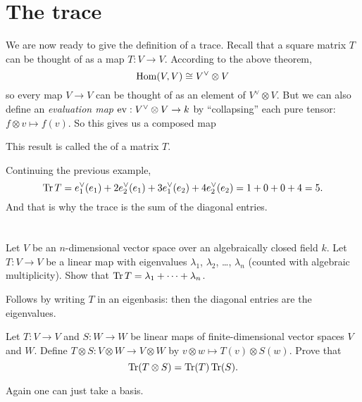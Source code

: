 \section{The trace}
We are now ready to give the definition of a trace.
Recall that a square matrix $T$ can be thought of as a map $T \colon V \to V$.
According to the above theorem,
\[ \operatorname{Hom}(V, V) \cong V^\vee \otimes V \]
so every map $V \to V$ can be thought of as an element of $V^\vee \otimes V$.
But we can also define an
\emph{evaluation map} $\operatorname{ev} : V^\vee \otimes V \to k$
by ``collapsing'' each pure tensor: $f \otimes v \mapsto f(v)$.
So this gives us a composed map
\begin{center}
\end{center}
This result is called the  of a matrix $T$.

\begin{example}
	Continuing the previous example,
	\[ \operatorname{Tr} T = e_1^\vee(e_1) + 2e_2^\vee(e_1) 
		+ 3e_1^\vee(e_2) + 4e_2^\vee(e_2)
		= 1 + 0 + 0 + 4 = 5. \]
	And that is why the trace is the sum of the diagonal entries.
\end{example}

\section{\problemhead}

\begin{problem}
	Let $V$ be an $n$-dimensional vector space
	over an algebraically closed field $k$.
	Let $T \colon V \to V$ be a linear map with
	eigenvalues $\lambda_1$, $\lambda_2$, \dots, $\lambda_n$
	(counted with algebraic multiplicity).
	Show that $\operatorname{Tr} T = \lambda_1 + \dots + \lambda_n$.
	\begin{hint}
		Follows by writing $T$ in an eigenbasis:
		then the diagonal entries are the eigenvalues.
	\end{hint}
\end{problem}

\begin{dproblem}
	Let $T \colon V \to V$ and $S \colon W \to W$ be linear maps
	of finite-dimensional vector spaces $V$ and $W$.
	Define $T \otimes S \colon V \otimes W \to V \otimes W$
	by $v \otimes w \mapsto T(v) \otimes S(w)$.
	Prove that \[ \operatorname{Tr}(T \otimes S) = \operatorname{Tr}(T) \operatorname{Tr}(S). \]
	\begin{hint}
		Again one can just take a basis.
	\end{hint}
\end{dproblem}

